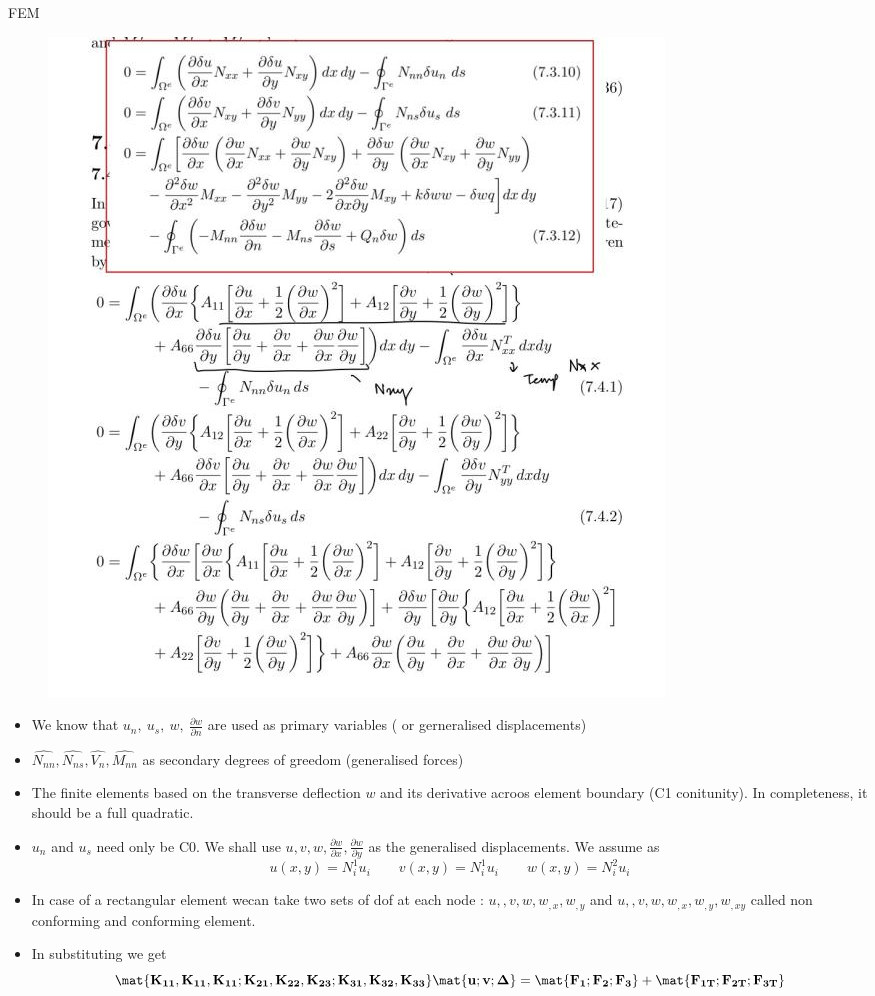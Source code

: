 	\begin{frame}{FEM}
		\begin{figure}
			\centering
			\includegraphics[width=0.6\linewidth]{Figure/fig39}  		
		\end{figure}
	\end{frame}


	\begin{frame}
		\begin{itemize}
			\item We know that $u_n,~u_s,~w,~\frac{\partial w}{\partial n}$ are used as primary variables ( or gerneralised displacements)
			\item $\hat{N_{nn}},\hat{N_{ns}},\hat{V_{n}},\hat{M_{nn}}$ as secondary degrees of greedom (generalised forces)
			\item The finite elements based on the transverse deflection $w$ and its derivative acroos element boundary (C1 conitunity). In completeness, it should be a full quadratic.
			\item $u_n$ and $u_s$ need only be C0. We shall use $u,v,w,\frac{\partial w}{\partial x}, \frac{\partial w}{\partial y}$ as the generalised displacements. We assume as
			\begin{equation}
			u(x,y) =N_i^1u_i \qquad v(x,y)=N_i^1u_i \qquad w(x,y) = N_i^2u_i
			\end{equation}
			\item In case of a rectangular element wecan take two sets of dof at each node : $u,,v,w,w_{,x},w_{,y}$ and $u,,v,w,w_{,x},w_{,y}, w_{,xy}$ called non conforming and conforming element. 
			\item  In substituting we get
			\begin{equation}
				\ve{\mat{K_{11},K_{11},K_{11};K_{21},K_{22},K_{23};K_{31},K_{32},K_{33}} \mat{u;v;\Delta} = \mat{F_1;F_2;F_3} + \mat{F_{1T};F_{ 2T};F_{3T}} }
			\end{equation}
			
		\end{itemize}
	\end{frame}



